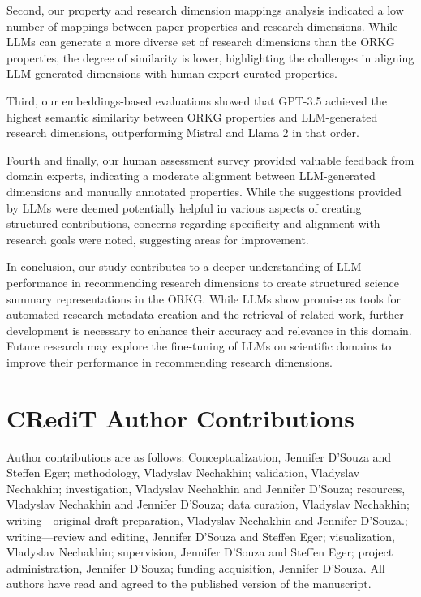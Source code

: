 Second, our property and research dimension mappings analysis indicated a low number of mappings between paper properties and research dimensions. While LLMs can generate a more diverse set of research dimensions than the ORKG properties, the degree of similarity is lower, highlighting the challenges in aligning LLM-generated dimensions with human expert curated properties.

Third, our embeddings-based evaluations showed that GPT-3.5 achieved the highest semantic similarity between ORKG properties and LLM-generated research dimensions, outperforming Mistral and Llama 2 in that order.

Fourth and finally, our human assessment survey provided valuable feedback from domain experts, indicating a moderate alignment between LLM-generated dimensions and manually annotated properties. While the suggestions provided by LLMs were deemed potentially helpful in various aspects of creating structured contributions, concerns regarding specificity and alignment with research goals were noted, suggesting areas for improvement.

In conclusion, our study contributes to a deeper understanding of LLM performance in recommending research dimensions to create structured science summary representations in the ORKG. While LLMs show promise as tools for automated research metadata creation and the retrieval of related work, further development is necessary to enhance their accuracy and relevance in this domain. Future research may explore the fine-tuning of LLMs on scientific domains to improve their performance in recommending research dimensions.


\section*{CRediT Author Contributions}
Author contributions are as follows: Conceptualization, Jennifer D'Souza and Steffen Eger; methodology, Vladyslav Nechakhin; validation, Vladyslav Nechakhin; investigation, Vladyslav Nechakhin and Jennifer D'Souza; resources, Vladyslav Nechakhin and Jennifer D'Souza; data curation, Vladyslav Nechakhin; writing---original draft preparation, Vladyslav Nechakhin and Jennifer D'Souza.; writing---review and editing, Jennifer D'Souza and Steffen Eger; visualization, Vladyslav Nechakhin; supervision, Jennifer D'Souza and Steffen Eger; project administration, Jennifer D'Souza; funding acquisition, Jennifer D'Souza. All authors have read and agreed to the published version of the manuscript.



